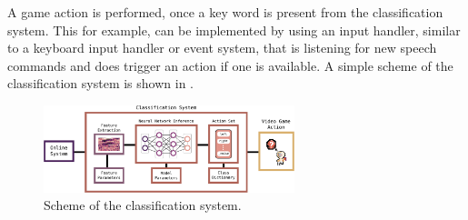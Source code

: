 A game action is performed, once a key word is present from the classification system.
This for example, can be implemented by using an input handler, similar to a keyboard input handler or event system, that is listening for new speech commands and does trigger an action if one is available.
A simple scheme of the classification system is shown in .
\begin{figure}[!ht]
  \centering
  \includegraphics[width=0.65\textwidth]{./6_game/figs/game_system_classification}
  \caption{Scheme of the classification system.}
  \label{fig:game_system_classification}
\end{figure}
\FloatBarrier
\noindent

